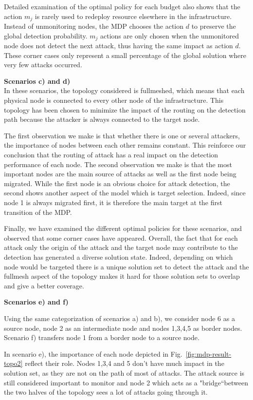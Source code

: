 Detailed examination of the optimal policy for each budget also shows that the action $m_j$ is rarely used to redeploy resource elsewhere in the infrastructure.
Instead of unmonitoring nodes, the MDP chooses the action $d$  to preserve the global detection probability.
$m_j$ actions are only chosen when the unmonitored node does not detect the next attack, thus having the same impact as action $d$. These corner cases only represent a small percentage of the global solution where very few attacks occurred.

\textbf{Scenarios c) and d) \\}
In these scenarios, the topology considered is fullmeshed, which means that each physical node is connected to every other node of the infrastructure. This topology has been chosen to minimize the impact of the routing on the detection path because the attacker is always connected to the target node.

The first observation we make is that whether there is one or several attackers, the importance of nodes between each other remains constant. This reinforce our conclusion that the routing of attack has a real impact on the detection performance of each node.
The second observation we make is that the most important nodes are the main source of attacks as well as the first node being migrated. While the first node is an obvious choice for attack detection, the second shows another aspect of the model which is target selection. Indeed, since node 1 is always migrated first, it is therefore the main target at the first transition of the MDP.

Finally, we have examined the different optimal policies for these scenarios, and observed that some corner cases have appeared.
Overall, the fact that for each attack only the origin of the attack and the target node may contribute to the detection has generated a diverse solution state. Indeed, depending on which node would be targeted there is a unique solution set to detect the attack and the fullmesh aspect of the topology makes it hard for those solution sets to overlap and give a better coverage.

\textbf{Scenarios e) and f) \\}

Using the same categorization of scenarios a) and b), we consider node 6 as a source node, node 2 as an intermediate node and nodes 1,3,4,5 as border nodes. Scenario f) transfers node 1 from a border node to a source node.

In scenario e), the importance of each node depicted in Fig.~\ref{fig:mdp-result-topo2} reflect their role. Nodes 1,3,4 and 5 don't have much impact in the solution set, as they are not on the path of most of attacks. The attack source is still considered important to monitor and node 2 which acts as a "bridge``between the two halves of the topology sees a lot of attacks going through it.


